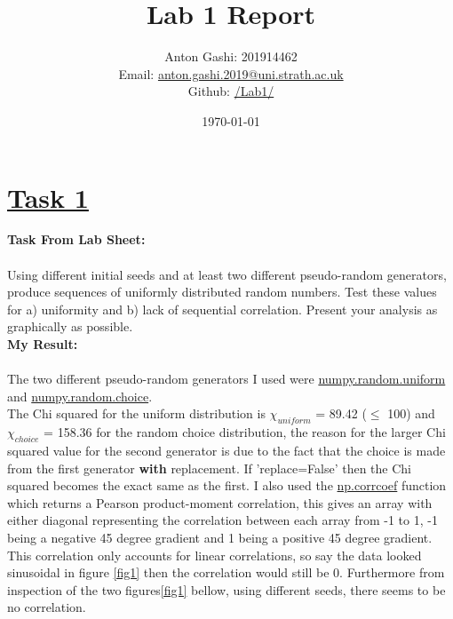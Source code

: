 \documentclass[12pt, A4]{article}
\title{Lab 1 Report}
\author{Anton Gashi: 201914462 \\ Email: \href{anton.gashi.2019@uni.strath.ac.uk}{anton.gashi.2019@uni.strath.ac.uk} \\ Github: \href{https://github.com/AntonGashi/Computation_Class}{/Lab1/}}
\date{\today}
\begin{document}
\begin{titlepage}
\clearpage\maketitle
\thispagestyle{empty}
\end{titlepage}


\section*{\underline{Task 1}}
\textbf{Task From Lab Sheet:} \\ \\ Using different initial seeds and at least two different pseudo-random generators, produce sequences of uniformly distributed random numbers. Test these values for a) uniformity and b) lack of sequential correlation. Present your analysis as graphically as possible.
\vspace{1.5em}\\
\textbf{My Result:} \\ \\ The two different pseudo-random generators I used were \href{https://numpy.org/doc/stable/reference/random/generated/numpy.random.uniform.html}{numpy.random.uniform} and \href{https://numpy.org/doc/stable/reference/random/generated/numpy.random.choice.html}{numpy.random.choice}. \\ The Chi squared for the uniform distribution is $\chi_{uniform}$ = 89.42 ($\le$ 100) and $\chi_{choice}$ = 158.36 for the random choice distribution, the reason for the larger Chi squared value for the second generator is due to the fact that the choice is made from the first generator \textbf{with} replacement. If 'replace=False' then the Chi squared becomes the exact same as the first. I also used the \href{"https://numpy.org/doc/stable/reference/generated/numpy.corrcoef.html"}{np.corrcoef} function which returns a Pearson product-moment correlation, this gives an array with either diagonal representing the correlation between each array from -1 to 1, -1 being a negative 45 degree gradient and 1 being a positive 45 degree gradient. This correlation only accounts for linear correlations, so say the data looked sinusoidal in figure \ref{fig1} then the correlation would still be 0. Furthermore from inspection of the two figures\ref{fig1} bellow, using different seeds, there seems to be no correlation.
\end{document}
